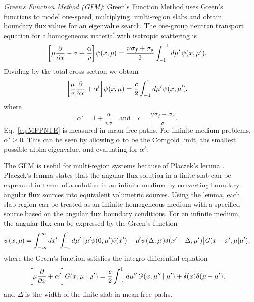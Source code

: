\textit{Green's Function Method (GFM)}: Green's Function Method \cite{kornreich_timeeigenvalue_2005} uses Green's functions to model one-speed, multiplying, multi-region slabs and obtain boundary flux values for an eigenvalue search. The one-group neutron transport equation for a homogeneous material with isotropic scattering is
\begin{equation}
	\bigg [ \mu \frac{\partial}{\partial x} + \sigma + \frac{\alpha}{v} \bigg ] \psi(x,\mu) = \frac{\nu \sigma_{f} + \sigma_{s}}{2} \int_{-1}^{-1} \mathop{}\!d \mu' \, \psi(x,\mu').
	\label{eq:GFMNTE}
\end{equation}
Dividing by the total cross section we obtain
\begin{equation}
	\bigg [ \frac{\mu}{\sigma} \frac{\partial}{\partial x} + \alpha' \bigg ] \psi(x,\mu) = \frac{c}{2} \int_{-1}^{1} \mathop{}\!d \mu' \, \psi(x,\mu'),
	\label{eq:MFPNTE}
\end{equation}
where
\begin{equation}
	\alpha' = 1 + \frac{\alpha}{v \sigma} \quad \text{and} \quad c = \frac{\nu \sigma_{f} + \sigma_{s}}{\sigma}.
\end{equation}
Eq.~\ref{eq:MFPNTE} is measured in mean free paths. For infinite-medium problems, $\alpha' \geq 0$. This can be seen by allowing $\alpha$ to be the Corngold limit, the smallest possible alpha-eigenvalue, and evaluating for $\alpha'$.

The GFM is useful for multi-region systems because of Placzek's lemma \cite{case1953introduction}. Placzek's lemma states that the angular flux solution in a finite slab can be expressed in terms of a solution in an infinite medium by converting boundary angular flux sources into equivalent volumetric sources. Using the lemma, each slab region can be treated as an infinite homogeneous medium with a specified source based on the angular flux boundary conditions. For an infinite medium, the angular flux can be expressed by the Green's function
\begin{equation}
\psi(x,\mu) = \int_{-\infty}^{\infty} \mathop{}\!d x' \, \int_{-1}^{1} \mathop{}\!d \mu' \, \big [ \mu' \psi(0,\mu') \delta(x') - \mu' \psi(\Delta,\mu') \delta(x'-\Delta,\mu') \big]  G(x-x', \mu | \mu'),
\end{equation}
where the Green's function satisfies the integro-differential equation
\begin{equation}
	\bigg [ \mu \frac{\partial}{\partial x} + \alpha' \bigg ] G(x,\mu \mid \mu') = \frac{c}{2} \int_{-1}^{1} \mathop{}\!d \mu'' \, G(x,\mu'' \mid \mu') + \delta(x) \delta(\mu - \mu'),
	\label{eq:GreenIntegroDiff}
\end{equation}
and $\Delta$ is the width of the finite slab in mean free paths.

